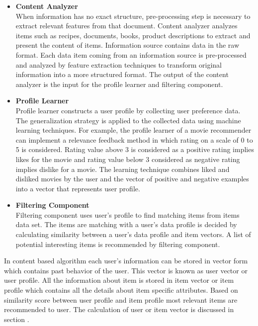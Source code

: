 \begin{itemize}
\item \textbf{Content Analyzer} 
\\
When information has no exact structure, pre-processing step is necessary to extract relevant features from that document. Content analyzer analyzes items such as recipes, documents, books, product descriptions to extract and present the content of items. Information source contains data in the raw format. Each data item coming from an information source is pre-processed and analyzed by feature extraction techniques to transform original information into a more structured format. The output of the content analyzer is the input for the profile learner and filtering component.

\item \textbf{Profile Learner} 
\\
Profile learner constructs a user profile by collecting user preference data. The generalization strategy is applied to the collected data using machine learning techniques. For example, the profile learner of a movie recommender can implement a relevance feedback method in which rating on a scale of 0 to 5 is considered. Rating value above 3 is considered as a positive rating implies likes for the movie and rating value below 3 considered as negative rating implies dislike for a movie. The learning technique combines liked and disliked movies by the user and the vector of positive and negative examples into a vector that represents user profile. 

\item \textbf{Filtering Component}
\\
Filtering component uses user's profile to find matching items from items data set. The items are matching with a user's data profile is decided by calculating similarity between a user's data profile and item vectors. A list of potential interesting items is recommended by filtering component. 
\end{itemize}
\noindent
In content based algorithm each user's information can be stored in vector form which contains past behavior of the user. This vector is known as user vector or user profile. All the information about item is stored in item vector or item profile which contains all the details about item specific attributes. Based on similarity score between user profile and item profile most relevant items are recommended to user. The calculation of user or item vector is discussed in section .

